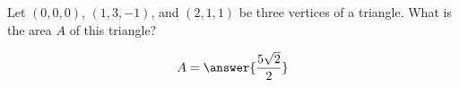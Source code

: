 \documentclass{ximera}
\author{Gregory Hartman \and Matthew Carr}
\begin{document}
\begin{exercise}
Let $(0,0,0)$, $(1,3,-1)$, and $(2,1,1)$ be three vertices of a triangle. What is the area $A$ of this triangle?
\begin{prompt}
\[
A=\answer{\frac{5\sqrt{2}}{2}}
\]
\end{prompt}


\end{exercise}
\end{document}
